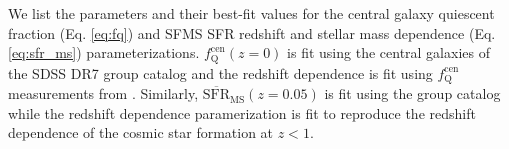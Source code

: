 \documentclass[iop,apj,tighten,twocolappendix,numberedappendix]{emulateapj}
\newcommand{\fqcen}{f_\mathrm{Q}^\mathrm{cen}}
\begin{document}
\begin{table}
\begin{center}
 \label{tab:fixed_params}
\end{center}
We list the parameters and their best-fit values for the
central galaxy quiescent fraction (Eq. \ref{eq:fq}) and SFMS  
SFR redshift and stellar mass dependence (Eq. \ref{eq:sfr_ms}) 
parameterizations. 
$\fqcen(z=0)$ is fit using the central galaxies of the SDSS DR7 
group catalog and the redshift dependence is fit using 
$\fqcen$ measurements from \cite{Tinker:2013aa}. 
Similarly, $\overline{\mathrm{SFR}}_\mathrm{MS}(z=0.05)$ is 
fit using the group catalog while the redshift dependence paramerization 
is fit to reproduce the redshift dependence of the \cite{Behroozi:2013aa} 
cosmic star formation at $z < 1$. 
\bigskip
\end{table}
\end{document}
